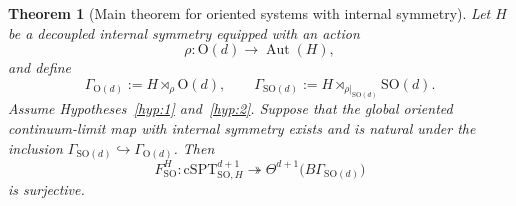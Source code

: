 \documentclass[aps,prx,reprint,superscriptaddress,twocolumn,amsmath,amssymb,amsfonts, nofootinbib]{revtex4-2}
\theoremstyle{apsstyle}
\newtheorem{theorem}{Theorem}[section]
\begin{document}
\begin{theorem}[Main theorem for oriented systems with internal symmetry]
\label{theorem:main_SO_internal}
Let $H$ be a decoupled internal symmetry equipped with an action
\begin{equation*}
    \rho:
    \mathrm O(d)\longrightarrow\operatorname{Aut}(H),
\end{equation*}
and define
\begin{equation*}
    \Gamma_{\mathrm O(d)}
    :=
    H\rtimes_{\rho}\mathrm O(d),
    \qquad
    \Gamma_{\mathrm{SO}(d)}
    :=
    H\rtimes_{\rho|_{\mathrm{SO}(d)}}\mathrm{SO}(d).
\end{equation*}
Assume Hypotheses~\ref{hyp:1} and~\ref{hyp:2}. Suppose that the global
oriented continuum-limit map with internal symmetry exists and is
natural under the inclusion
$\Gamma_{\mathrm{SO}(d)}\hookrightarrow\Gamma_{\mathrm O(d)}$.
Then
\begin{equation}
    F_{\mathrm{SO}}^{H}:
    \mathrm{cSPT}^{d+1}_{\mathrm{SO},H}
    \twoheadrightarrow
    \Theta^{d+1}
    \bigl(B\Gamma_{\mathrm{SO}(d)}\bigr)
    \label{eq:maintheorem_SO_internal}
\end{equation}
is surjective.
\end{theorem}
\end{document}
